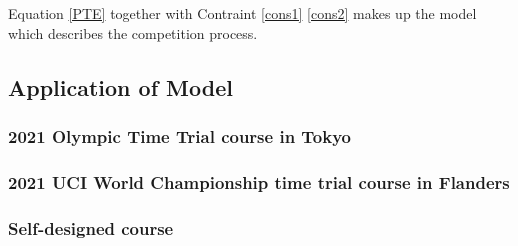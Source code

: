 \par Equation \ref{PTE} together with Contraint \ref{cons1} \ref{cons2} makes up the model which describes the competition process.

\subsection{Application of Model}
\subsubsection{2021 Olympic Time Trial course in Tokyo}

\subsubsection{2021 UCI World Championship time trial course in Flanders}

\subsubsection{Self-designed course}


\subsection{}